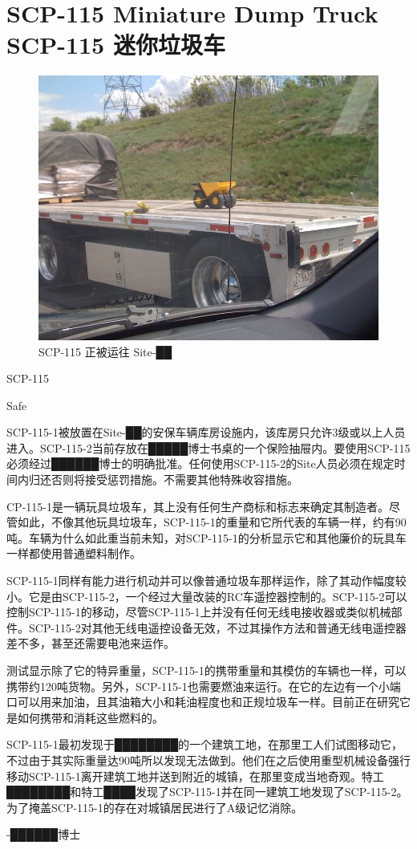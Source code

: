 \chapter[SCP-115 迷你垃圾车]{
    SCP-115 Miniature Dump Truck\\
    SCP-115 迷你垃圾车
}

\label{chap:SCP-115}

\begin{figure}[H]
    \centering
    \includegraphics[width=0.5\linewidth]{images/SCP-115.jpg}
    \caption*{SCP-115 正被运往 Site-██}
\end{figure}

SCP-115

Safe

SCP-115-1被放置在Site-██的安保车辆库房设施内，该库房只允许3级或以上人员进入。SCP-115-2当前存放在█████博士书桌的一个保险抽屉内。要使用SCP-115必须经过██████博士的明确批准。任何使用SCP-115-2的Site人员必须在规定时间内归还否则将接受惩罚措施。不需要其他特殊收容措施。

CP-115-1是一辆玩具垃圾车，其上没有任何生产商标和标志来确定其制造者。尽管如此，不像其他玩具垃圾车，SCP-115-1的重量和它所代表的车辆一样，约有90吨。车辆为什么如此重当前未知，对SCP-115-1的分析显示它和其他廉价的玩具车一样都使用普通塑料制作。

SCP-115-1同样有能力进行机动并可以像普通垃圾车那样运作，除了其动作幅度较小。它是由SCP-115-2，一个经过大量改装的RC车遥控器控制的。SCP-115-2可以控制SCP-115-1的移动，尽管SCP-115-1上并没有任何无线电接收器或类似机械部件。SCP-115-2对其他无线电遥控设备无效，不过其操作方法和普通无线电遥控器差不多，甚至还需要电池来运作。

测试显示除了它的特异重量，SCP-115-1的携带重量和其模仿的车辆也一样，可以携带约120吨货物。另外，SCP-115-1也需要燃油来运行。在它的左边有一个小端口可以用来加油，且其油箱大小和耗油程度也和正规垃圾车一样。目前正在研究它是如何携带和消耗这些燃料的。

SCP-115-1最初发现于████████的一个建筑工地，在那里工人们试图移动它，不过由于其实际重量达90吨所以发现无法做到。他们在之后使用重型机械设备强行移动SCP-115-1离开建筑工地并送到附近的城镇，在那里变成当地奇观。特工████████和特工████发现了SCP-115-1并在同一建筑工地发现了SCP-115-2。为了掩盖SCP-115-1的存在对城镇居民进行了A级记忆消除。

 -██████博士
